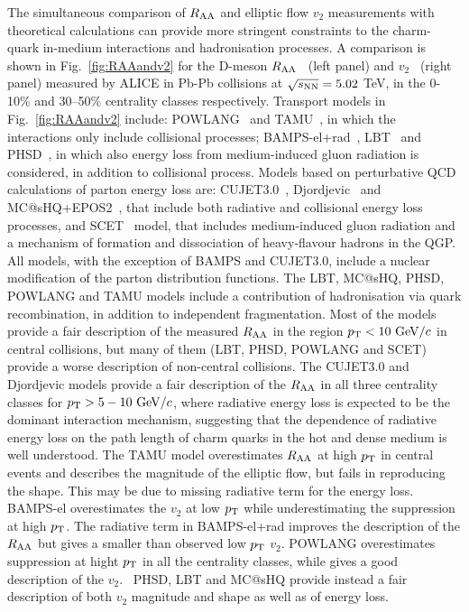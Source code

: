 The simultaneous comparison of $R_{\rm AA}$ and elliptic flow $v_2$ measurements 
with theoretical calculations can provide more stringent constraints to the 
charm-quark in-medium interactions and hadronisation processes.
A comparison is shown in Fig.~\ref{fig:RAAandv2} for the 
D-meson $R_{\rm AA}$~\cite{ALICE-PUBLIC-2017-003} (left panel) 
and $v_2$~\cite{Acharya:2017qps} (right panel) measured
by ALICE in Pb-Pb collisions at $\sqrt{s_{\rm NN}} = 5.02$ TeV, in the 0-10\% and 30--50\% 
centrality classes respectively.
Transport models in Fig.~\ref{fig:RAAandv2} include: 
POWLANG~\cite{Beraudo:2014boa} and TAMU~\cite{He:2014cla}, 
in which the interactions only include collisional processes; 
BAMPS-el+rad~\cite{Uphoff:2014hza}, LBT~\cite{Cao:2017hhk} and 
PHSD~\cite{Song:2015ykw}, in which also energy loss from medium-induced gluon radiation
is considered, in addition to collisional process.
Models based on perturbative QCD calculations of parton energy loss 
are: CUJET3.0~\cite{Xu:2015bbz}, Djordjevic~\cite{Djordjevic:2015hra} 
and MC@sHQ+EPOS2~\cite{Nahrgang:2013xaa}, that include both radiative 
and collisional energy loss processes, and SCET~\cite{Kang:2016ofv} model, that includes 
medium-induced gluon radiation and a mechanism of formation and dissociation of 
heavy-flavour hadrons in the QGP. All models, with the exception of BAMPS and CUJET3.0, 
include a nuclear modification of the parton distribution functions.
The LBT, MC@sHQ, PHSD, POWLANG and TAMU
models include a contribution of hadronisation via quark recombination, 
in addition to independent fragmentation. 
Most of the models provide a fair description of the measured $R_{\rm AA}$ in the region 
$p_{\rm T}<10~\mathrm{GeV}/c$ in central collisions, 
but many of them (LBT, PHSD, POWLANG and SCET) provide a worse 
description of non-central collisions.
The CUJET3.0 and Djordjevic models provide a fair description of the $R_{\rm AA}$ in all three 
centrality classes for $p_{\rm T} > 5-10~\mathrm{GeV}/c$, where radiative energy loss 
is expected to be the dominant interaction mechanism, suggesting that 
the dependence of radiative energy loss on the path length of charm 
quarks in the hot and dense medium is well understood. 
The TAMU model overestimates $R_{\rm AA}$ at high $p_{\rm T}$ in central events and describes 
the magnitude of the elliptic flow, but fails in reproducing the shape. This
may be due to missing radiative term for the energy loss. 
BAMPS-el overestimates the $v_2$ at low $p_{\rm T}$ while underestimating the 
suppression at high $p_{\rm T}$. The radiative term in BAMPS-el+rad improves the 
description of the $R_{\rm AA}$ but gives a smaller than observed low $p_{\rm T}$ 
$v_2$. POWLANG overestimates suppression at hight $p_{\rm T}$ in all the centrality classes,
while gives a good description of the $v_2$.
~PHSD, LBT and MC@sHQ provide instead a fair 
description of both $v_2$ magnitude and shape
as well as of energy loss.\\





